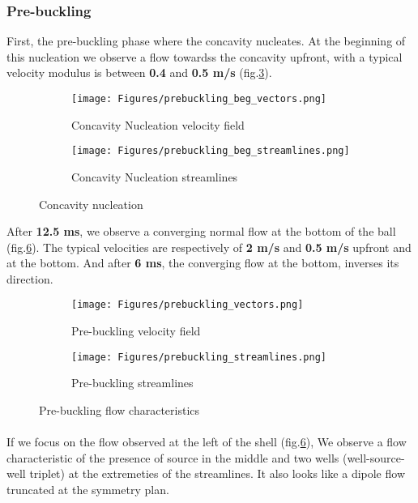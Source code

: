 \documentclass[a4paper,10pt]{report}
\begin{document}
\subsubsection{Pre-buckling}
First, the pre-buckling phase where the concavity nucleates. At the beginning of this nucleation we observe a flow towardss the concavity upfront, with a typical velocity modulus is between \textbf{0.4} and \textbf{0.5 m/s} (fig.\ref{fig:ConcavityNucleationflowcharacteristics}). 
\begin{figure}[htbp]%
	\centering%
	 \begin{subfigure}[h]{0.5\textwidth}%
        \texttt{[image: Figures/prebuckling\_beg\_vectors.png]}%
        \caption{Concavity Nucleation velocity field}%
				\label{fig:ConcavityNucleationvelocityfield}%
    \end{subfigure}%
    \begin{subfigure}[h]{0.5\linewidth}%
        \texttt{[image: Figures/prebuckling\_beg\_streamlines.png]}%
        \caption{Concavity Nucleation streamlines}%
        \label{fig:ConcavityNucleationstreamlines}%
    \end{subfigure}%
		\caption{Concavity nucleation}%
		\label{fig:ConcavityNucleationflowcharacteristics}%
\end{figure}
After \textbf{12.5 ms}, we observe a converging normal flow at the bottom of the ball (fig.\ref{fig:PreBucklingflowcharacteristics}). 
The typical velocities are respectively of \textbf{2 m/s} and \textbf{0.5 m/s}  upfront and at the bottom. And after \textbf{6 ms}, the converging flow at the bottom, inverses its direction.
\begin{figure}[htbp]%
	\centering%
	 \begin{subfigure}[h]{0.5\textwidth}%
        \texttt{[image: Figures/prebuckling\_vectors.png]}%
        \caption{Pre-buckling velocity field}%
				\label{fig:PreBucklingVelocityField}%
    \end{subfigure}%
    \begin{subfigure}[h]{0.5\textwidth}%
        \texttt{[image: Figures/prebuckling\_streamlines.png]}%
        \caption{Pre-buckling streamlines}%
        \label{fig:PreBucklingstreamlines}%
    \end{subfigure}%
		\caption{Pre-buckling flow characteristics}%
		\label{fig:PreBucklingflowcharacteristics}%
\end{figure}
\paragraph{}
If we focus on the flow observed at the left of the shell (fig.\ref{fig:PreBucklingflowcharacteristics}), We observe a flow characteristic of the presence of source in the middle and two wells (well-source-well triplet) at the extremeties of the streamlines.
It also looks like a dipole flow truncated at the symmetry plan.
\end{document}
